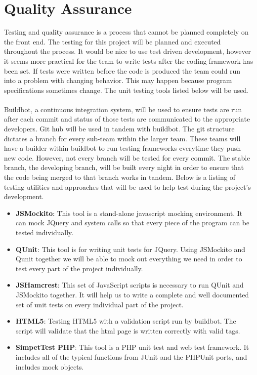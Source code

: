\documentclass[12pt, letterpaper]{article}
\begin{document}
\section{Quality Assurance}
    Testing and quality assurance is a process that cannot be planned completely
    on the front end. The testing for this project will be planned and executed
    throughout the process. It would be nice to use test driven development,
    however it seems more practical for the team to write tests after the coding
    framework has been set. If tests were written before the code is produced
    the team could run into a problem with changing behavior. This may happen
    because program specifications sometimes change. The unit testing tools
    listed below will be used.
	\\\\
	Buildbot, a continuous integration system, will be used to ensure tests are
    run after each commit and status of those tests are communicated to the
    appropriate developers. Git hub will be used in tandem with buildbot. The
    git structure dictates a branch for every sub-team within the larger team.
    These teams will have a builder within buildbot to run testing frameworks
    everytime they push new code. However, not every branch will be tested for
    every commit. The stable branch, the developing branch, will be built every
    night in order to ensure that the code being merged to that branch works in
    tandem. Below is a listing of testing utilities and approaches that will be
    used to help test during the project's development.
\begin{itemize}
    \item {\bf JSMockito}: This tool is a stand-alone javascript mocking
    environment. It can mock JQuery and system calls so that every piece of the
    program can be tested individually.
    \item {\bf QUnit}: This tool is for writing unit tests for JQuery. Using
    JSMockito and Qunit together we will be able to mock out everything we need
    in order to test every part of the project individually.
    \item {\bf JSHamcrest}: This set of JavaScript scripts is necessary to run
    QUnit and JSMockito together. It will help us to write a complete and well
    documented set of unit tests on every individual part of the project.
    \item {\bf HTML5}: Testing HTML5 with a validation script run by buildbot.
    The script will validate that the html page is written correctly with valid
    tags. 
	\item {\bf SimpetTest PHP}: This tool is a PHP unit test and web test framework. 
	It includes all of the typical functions from JUnit and the PHPUnit ports, and 
	includes mock objects.
\end{itemize}
\end{document}
